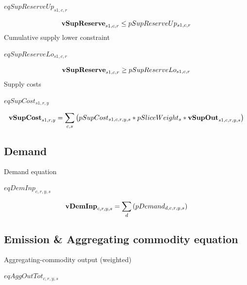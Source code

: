 \documentclass{article}
\begin{document}
$eqSupReserveUp_{s1,c,r}$





\begin{dmath} 
{\bf vSupReserve}_{s1,c,r}  \le  pSupReserveUp_{s1,c,r}
\end{dmath} 
Cumulative supply lower constraint







$eqSupReserveLo_{s1,c,r}$





\begin{dmath} 
{\bf vSupReserve}_{s1,c,r}  \ge  pSupReserveLo_{s1,c,r}
\end{dmath} 
Supply costs







$eqSupCost_{s1,r,y}$





\begin{dmath} 
{\bf vSupCost}_{s1,r,y}  =  \sum_{c,s}{\left(pSupCost_{s1,c,r,y,s}*pSliceWeight_{s}*{\bf vSupOut}_{s1,c,r,y,s}\right)}
\end{dmath} 
\subsection*{Demand}
Demand equation







$eqDemInp_{c,r,y,s}$





\begin{dmath} 
{\bf vDemInp}_{c,r,y,s}  =  \sum_{d}{\left(pDemand_{d,c,r,y,s}\right)}
\end{dmath} 
\subsection*{Emission \& Aggregating commodity equation}
Aggregating-commodity output (weighted)







$eqAggOutTot_{c,r,y,s}$
\end{document}
